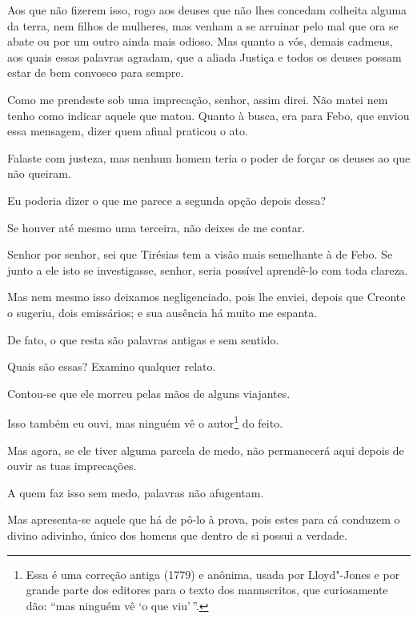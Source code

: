 Aos que não fizerem isso, rogo aos deuses que não lhes concedam colheita
 alguma da terra, nem filhos de mulheres, mas venham a se arruinar
pelo mal que ora se abate ou por um outro ainda mais odioso. Mas quanto
a vós, demais cadmeus, aos quais essas palavras agradam, que a aliada
Justiça e todos os deuses possam estar de bem convosco para sempre.

   Como me prendeste sob uma imprecação, senhor, assim direi. Não matei nem
tenho como indicar aquele que matou. Quanto à busca, era para Febo, que
enviou essa mensagem, dizer quem afinal praticou o ato.

 Falaste com justeza, mas nenhum homem teria o poder de forçar os
deuses ao que não queiram.

   Eu poderia dizer o que me parece a segunda opção depois dessa?

   Se houver até mesmo uma terceira, não deixes de me contar.

   Senhor por senhor, sei que Tirésias tem a visão mais semelhante à de
Febo. Se junto a ele isto se investigasse, senhor, seria possível
aprendê-lo com toda clareza.

   Mas nem mesmo isso deixamos negligenciado, pois lhe enviei, depois que
Creonte o sugeriu, dois emissários; e sua ausência há muito me espanta.

 De fato, o que resta são palavras antigas e sem sentido.

   Quais são essas? Examino qualquer relato.

   Contou-se que ele morreu pelas mãos de alguns viajantes.

   Isso também eu ouvi, mas ninguém vê o autor\footnote{Essa é uma correção
  antiga ({1779}) e anônima, usada por Lloyd"-Jones e por grande parte dos
  editores para o texto dos manuscritos, que curiosamente dão: ``mas
  ninguém vê `o que viu'\,''.} do feito.


   Mas agora, se ele tiver alguma parcela de medo, não permanecerá aqui
depois de ouvir as tuas imprecações.

   A quem faz isso sem medo, palavras não afugentam.

   Mas apresenta-se aquele que há de pô-lo à prova, pois estes para cá
conduzem o divino adivinho, único dos homens que dentro de si possui a
verdade.

